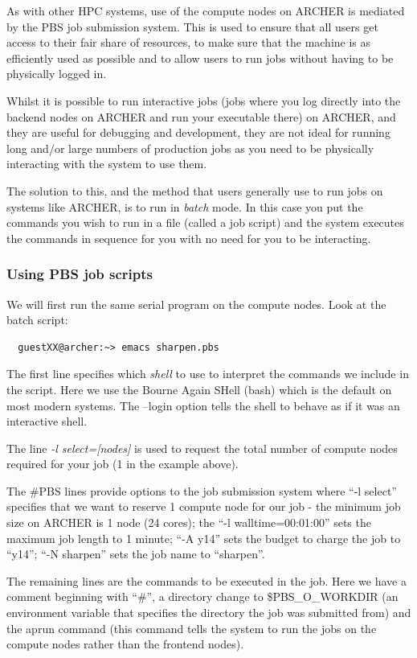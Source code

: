 \documentclass{article}
\begin{document}
As with other HPC systems, use of the compute nodes on ARCHER is mediated by the PBS
job submission system. This is used to ensure that all users get access to
their fair share of resources, to make sure that the machine is as
efficiently used as possible and to allow users to run jobs without
having to be physically logged in.

Whilst it is possible to run interactive jobs (jobs where you log directly into the backend nodes on ARCHER and run your executable there) on ARCHER, and they are useful for debugging and development,
they are not ideal for running long and/or large numbers of production
jobs as you need to be physically interacting with the system to use
them.

The solution to this, and the method that users generally use to run jobs on systems like ARCHER, is to run in \emph{batch} mode. In this case you put
the commands you wish to run in a file (called a job script) and the
system executes the commands in sequence for you with no need for you
to be interacting.

\subsubsection{Using PBS job scripts}
\label{sec-3-7-1}


We will first run the same serial program on the compute nodes.
Look at the batch script:

\begin{verbatim}
  guestXX@archer:~> emacs sharpen.pbs
\end{verbatim}

The first line specifies which \emph{shell} to use to interpret the commands we
include in the script. Here we use the Bourne Again SHell (bash) which is
the default on most modern systems. The --login option tells the shell to
behave as if it was an interactive shell.

 The line \emph{-l select=[nodes]} is used to request
the total number of compute nodes required for your job (1 in the example
above).

The \#PBS lines provide options to the job submission system where
``-l select'' specifies that we want to reserve 1 compute node for
our job - the minimum job size on ARCHER is 1 node (24 cores); the
``-l walltime=00:01:00'' sets the maximum job length to 1 minute;
``-A y14'' sets the budget to charge the job to ``y14''; ``-N
sharpen'' sets the job name to ``sharpen''. 

The remaining lines are the commands to be executed in the job. Here
we have a comment beginning with ``\#'', a directory change to
\$PBS\_O\_WORKDIR (an environment variable that specifies the
directory the job was submitted from) and the aprun command (this
command tells the system to run the jobs on the compute nodes rather
than the frontend nodes).
\end{document}

